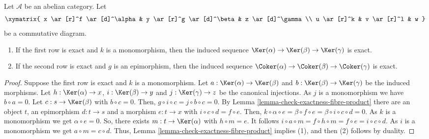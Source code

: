 \begin{lemma}
\label{lemma-exact-kernel-sequence}
Let $\mathcal{A}$ be an abelian category. Let
$$
\xymatrix{
x \ar[r]^f \ar[d]^\alpha &
y \ar[r]^g \ar[d]^\beta &
z \ar[d]^\gamma\\
u \ar[r]^k & v \ar[r]^l & w
}
$$
be a commutative diagram.
\begin{enumerate}
\item If the first row is exact and $k$ is a monomorphism, then the induced 
sequence $\Ker(\alpha) \to \Ker(\beta) \to \Ker(\gamma)$ 
is exact.
\item If the second row is exact and $g$ is an epimorphism, then the induced 
sequence
$\Coker(\alpha) \to \Coker(\beta) \to \Coker(\gamma)$ 
is exact.
\end{enumerate}
\end{lemma}

\begin{proof}
Suppose the first row is exact and $k$ is a monomorphism. Let 
$a:\Ker(\alpha)\to\Ker(\beta)$ and 
$b:\Ker(\beta)\to\Ker(\gamma)$ be the induced morphisms. 
Let $h:\Ker(\alpha)\to x$, $i:\Ker(\beta)\to y$ and 
$j:\Ker(\gamma)\to z$ be the canonical injections. As $j$ is 
a monomorphism we have $b\circ a=0$. Let $c:s\to\Ker(\beta)$ 
with $b\circ c=0$. Then, $g\circ i\circ c=j\circ b\circ c=0$. By 
Lemma \ref{lemma-check-exactness-fibre-product} there are an object $t$, an 
epimorphism $d:t\to s$ and a morphism $e:t\to x$ with 
$i\circ c\circ d=f\circ e$. Then, 
$k\circ \alpha\circ e=\beta\circ f\circ e=\beta\circ i\circ c\circ d=0$. 
As $k$ is a monomorphism we get $\alpha\circ e=0$. So, there exists 
$m:t\to\Ker(\alpha)$ with $h\circ m=e$. It follows 
$i\circ a\circ m=f\circ h\circ m=f\circ e=i\circ c\circ d$. 
As $i$ is a monomorphism we get $a\circ m=c\circ d$. Thus, 
Lemma \ref{lemma-check-exactness-fibre-product} implies (1), and then 
(2) follows by duality.
\end{proof}

